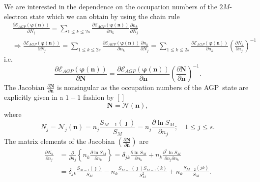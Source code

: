 \documentclass[aps,preprint]{revtex4}%
\begin{document}
We are interested in the dependence on the occupation numbers of the
$2M$-electron state which we can obtain by using the chain rule
\begin{align}
&  \frac{\partial\mathcal{E}_{AGP}\left(  \boldsymbol{\varphi}\left(
\boldsymbol{n}\right)  \right)  }{\partial N_{j}}=\sum_{1\leq k\leq2s}%
\frac{\partial\mathcal{E}_{AGP}\left(  \boldsymbol{\varphi}\left(
\boldsymbol{n}\right)  \right)  }{\partial n_{k}}\frac{\partial n_{k}%
}{\partial N_{j}}\nonumber\\
&  \Rightarrow\frac{\partial\mathcal{E}_{AGP}\left(  \boldsymbol{\varphi
}\left(  \boldsymbol{n}\right)  \right)  }{\partial N_{j}}=\sum_{1\leq
k\leq2s}\frac{\partial\mathcal{E}_{AGP}\left(  \boldsymbol{\varphi}\left(
\boldsymbol{n}\right)  \right)  }{\partial n_{k}}\frac{\partial n_{k}%
}{\partial N_{j}}=\sum_{1\leq k\leq2s}\frac{\partial\mathcal{E}_{AGP}\left(
\boldsymbol{\varphi}\left(  \boldsymbol{n}\right)  \right)  }{\partial n_{k}%
}\left(  \frac{\partial N_{k}}{\partial n_{j}}\right)  ^{-1}%
\end{align}
i.e.%
\begin{equation}
\frac{\partial\mathcal{E}_{AGP}\left(  \boldsymbol{\varphi}\left(
\boldsymbol{n}\right)  \right)  }{\partial\boldsymbol{N}}=\frac{\partial
\mathcal{E}_{AGP}\left(  \boldsymbol{\varphi}\left(  \boldsymbol{n}\right)
\right)  }{\partial\boldsymbol{n}}\left(  \frac{\partial\boldsymbol{N}%
}{\partial\boldsymbol{n}}\right)  ^{-1}.
\end{equation}
The Jacobian $\frac{\partial\boldsymbol{N}}{\partial\boldsymbol{n}}$ is
nonsingular as the occupation numbers of the AGP\ state are explicitly given
in a $1-1$ fashion by $\left[  {}\right]  $
\begin{equation}
\boldsymbol{N}=\mathcal{N}\left(  \boldsymbol{n}\right)  ,
\end{equation}
where
\begin{equation}
N_{j}=\mathcal{N}_{j}\left(  \boldsymbol{n}\right)  =n_{j}\frac{S_{M-1}\left(
\jmath\right)  }{S_{M}}=n_{j}\frac{\partial\ln S_{M}}{\partial n_{j}}%
;\quad1\leq j\leq s.
\end{equation}
The matrix elements of the Jacobian $\left(  \frac{\partial\boldsymbol{N}%
}{\partial\boldsymbol{n}}\right)  $ are
\begin{align}
\frac{\partial N_{k}}{\partial n_{j}}  &  =\frac{\partial}{\partial n_{j}%
}\left\{  n_{k}\frac{\partial\ln S_{M}}{\partial n_{k}}\right\}  =\delta
_{jk}\frac{\partial\ln S_{M}}{\partial n_{k}}+n_{k}\frac{\partial^{2}\ln
S_{M}}{\partial n_{j}\partial n_{k}}\nonumber\\
&  =\delta_{jk}\frac{S_{M-1}\left(  \jmath\right)  }{S_{M}}-n_{k}\frac
{S_{M-1}\left(  \jmath\right)  S_{M-1}\left(  k\right)  }{S_{M}^{2}}%
+n_{k}\frac{S_{M-2}\left(  jk\right)  }{S_{M}}.
\end{align}
\end{document}
